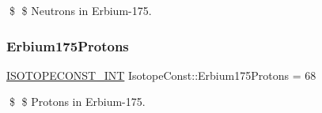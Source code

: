 \$ \$ Neutrons in Erbium-\/175. \mbox{\label{group___isotope_const-_erbium-_er175_gacf998f1d1225546ac9952cd80f1a1c90}} 
\subsubsection{\texorpdfstring{Erbium175\+Protons}{Erbium175Protons}}
{\footnotesize\ttfamily \mbox{\hyperlink{group___isotope_const-_macros_ga5f18360b3e99483a35c32d789e62621c}{I\+S\+O\+T\+O\+P\+E\+C\+O\+N\+S\+T\+\_\+\+I\+NT}} Isotope\+Const\+::\+Erbium175\+Protons = 68}

\$ \$ Protons in Erbium-\/175. 